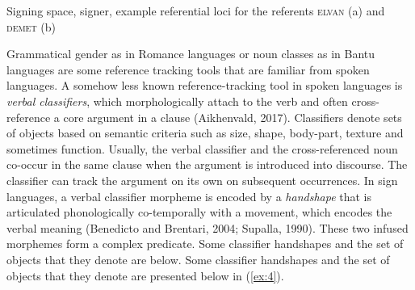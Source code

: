 \documentclass[]{elsarticle} %
\begin{document}
    \begin{exe}
    \ex \label{ex:3} Signing space, signer, example referential loci for the referents \textsc{elvan} (a) and \textsc{demet} (b) \\

    \end{exe}

Grammatical gender as in Romance languages or noun classes as in Bantu
languages are some reference tracking tools that are familiar from
spoken languages. A somehow less known reference-tracking tool in spoken
languages is \emph{verbal classifiers}, which morphologically attach to
the verb and often cross-reference a core argument in a clause
(Aikhenvald, 2017). Classifiers denote sets of objects based on semantic
criteria such as size, shape, body-part, texture and sometimes function.
Usually, the verbal classifier and the cross-referenced noun co-occur in
the same clause when the argument is introduced into discourse. The
classifier can track the argument on its own on subsequent occurrences.
In sign languages, a verbal classifier morpheme is encoded by a
\emph{handshape} that is articulated phonologically co-temporally with a
movement, which encodes the verbal meaning (Benedicto and Brentari,
2004; Supalla, 1990). These two infused morphemes form a complex
predicate. Some classifier handshapes and the set of objects that they
denote are below. Some classifier handshapes and the set of objects that
they denote are presented below in (\ref{ex:4}).
\end{document}
